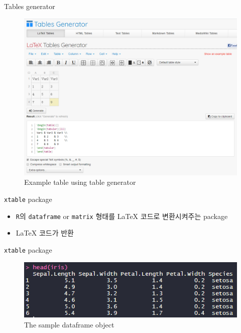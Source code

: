 \documentclass{beamer}
\begin{document}
\begin{frame}{Tables generator}
	\begin{figure}[h] %
		\begin{center}
			\includegraphics[width=0.7\linewidth]{img/table_generator.png}
		\end{center}
		\caption{Example table using table generator}
		\label{fig:long}
		\label{fig:onecol}
	\end{figure}
\end{frame}



\begin{frame}{\texttt{xtable} package}
	\begin{itemize}
		\item {
			\texttt{R}의 \texttt{dataframe} or \texttt{matrix} 형태를 \textrm{\LaTeX} 코드로 변환시켜주는 package
		}
		\item {
			\textrm{\LaTeX} 코드가 반환
		}
	\end{itemize}
\end{frame}

\begin{frame}{\texttt{xtable} package}
	\begin{figure}[h] %
		\begin{center}
			\includegraphics[width=0.9\linewidth]{img/xtable1.png}
		\end{center}
		\caption{The sample dataframe object}
		\label{fig:long}
		\label{fig:onecol}
	\end{figure}
\end{frame}
\end{document}
